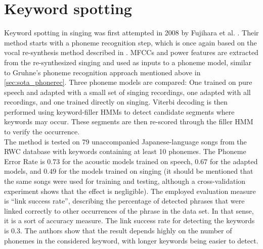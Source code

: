 \section{Keyword spotting}
Keyword spotting in singing was first attempted in 2008 by Fujihara et al. \cite{hyperlinking_lyrics}. Their method starts with a phoneme recognition step, which is once again based on the vocal re-synthesis method described in \cite{fujihara_identification}. MFCCs and power features are extracted from the re-synthesized singing and used as inputs to a phoneme model, similar to Gruhne's phoneme recognition approach mentioned above in \ref{sec:sota_phonerec}.  Three phoneme models are compared: One trained on pure speech and adapted with a small set of singing recordings, one adapted with all recordings, and one trained directly on singing. Viterbi decoding is then performed using keyword-filler HMMs to detect candidate segments where keywords may occur. These segments are then re-scored through the filler HMM to verify the occurrence.\\
The method is tested on 79 unaccompanied Japanese-language songs from the RWC database \cite{rwc} with keywords containing at least 10 phonemes. The Phoneme Error Rate is $0.73$ for the acoustic models trained on speech, $0.67$ for the adapted models, and $0.49$ for the models trained on singing (it should be mentioned that the same songs were used for training and testing, although a cross-validation experiment shows that the effect is negligible). The employed evaluation measure is ``link success rate'', describing the percentage of detected phrases that were linked correctly to other occurrences of the phrase in the data set. In that sense, it is a sort of accuracy measure. The link success rate for detecting the keywords is $0.3$. The authors show that the result depends highly on the number of phonemes in the considered keyword, with longer keywords being easier to detect.\\

